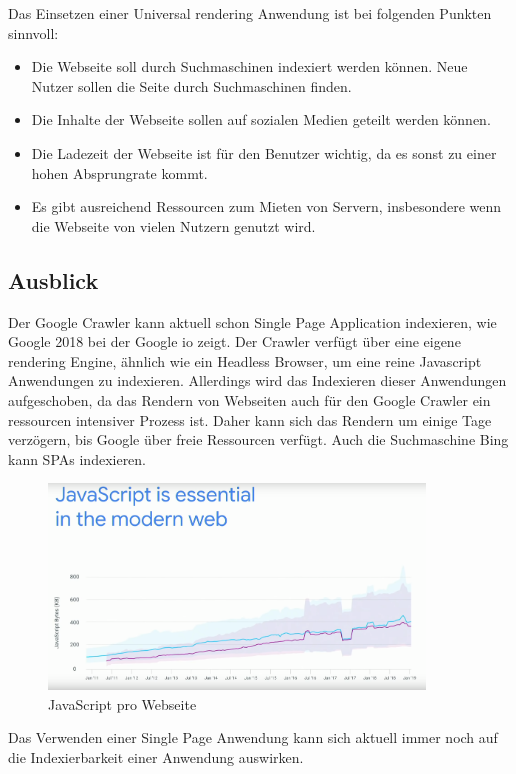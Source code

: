 \documentclass[runningheads]{llncs}
\numberwithin{figure}{section}
\begin{document}
\newpage
\noindent
Das Einsetzen einer Universal rendering Anwendung ist bei folgenden Punkten sinnvoll: 
\begin{itemize}
  \setlength\itemsep{1em}
  \item Die Webseite soll durch Suchmaschinen indexiert werden können. 
    Neue Nutzer sollen die Seite durch Suchmaschinen finden.
  \item Die Inhalte der Webseite sollen auf sozialen Medien geteilt werden können. 
  \item Die Ladezeit der Webseite ist für den Benutzer wichtig, 
  da es sonst zu einer hohen Absprungrate kommt.
  \item Es gibt ausreichend Ressourcen zum Mieten von Servern, 
  insbesondere wenn die Webseite von vielen Nutzern genutzt wird. 
\end{itemize}
\subsection{Ausblick}
\label{subsec:Ausblick}
Der Google Crawler kann aktuell schon Single Page Application indexieren, 
wie Google 2018 bei der Google io zeigt. 
Der Crawler verfügt über eine eigene rendering Engine, 
ähnlich wie ein Headless Browser, 
um eine reine Javascript Anwendungen zu indexieren. 
Allerdings wird das Indexieren dieser Anwendungen aufgeschoben, 
da das Rendern von Webseiten auch für den Google Crawler 
ein ressourcen intensiver Prozess ist. 
Daher kann sich das Rendern um einige Tage verzögern, 
bis Google über freie Ressourcen verfügt. 
Auch die Suchmaschine Bing kann SPAs indexieren. \cite{GoogleSearchAndJS} \cite{SearchFriendly}
\begin{figure}
  \centering
  \includegraphics[width=10cm]{images/JavaScriptGoogleShips}
  \caption{JavaScript pro Webseite \cite{SearchFriendly}}
  \label{JavaScript pro Website}
\end{figure}
\newpage
\noindent
Das Verwenden einer Single Page Anwendung 
kann sich aktuell immer noch auf die Indexierbarkeit einer Anwendung auswirken. 
\end{document}
